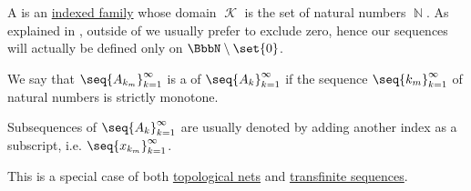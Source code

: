 \begin{definition}\label{def:sequence}
  A  is an \hyperref[def:indexed_family]{indexed family} whose domain \( \mscrK \) is the set of natural numbers \( \BbbN \). As explained in , outside of  we usually prefer to exclude zero, hence our sequences will actually be defined only on \( \BbbN \setminus \set{ 0 } \).

  We say that \( \seq{ A_{k_m} }_{k=1}^\infty \) is a  of \( \seq{ A_k }_{k=1}^\infty \) if the sequence \( \seq{ k_m }_{k=1}^\infty \) of natural numbers is strictly monotone.

  Subsequences of \( \seq{ A_k }_{k=1}^\infty \) are usually denoted by adding another index as a subscript, i.e. \( \seq{ x_{k_m} }_{k=1}^\infty \).

  This is a special case of both \hyperref[def:topological_net]{topological nets} and \hyperref[def:transfinite_sequence]{transfinite sequences}.
\end{definition}

